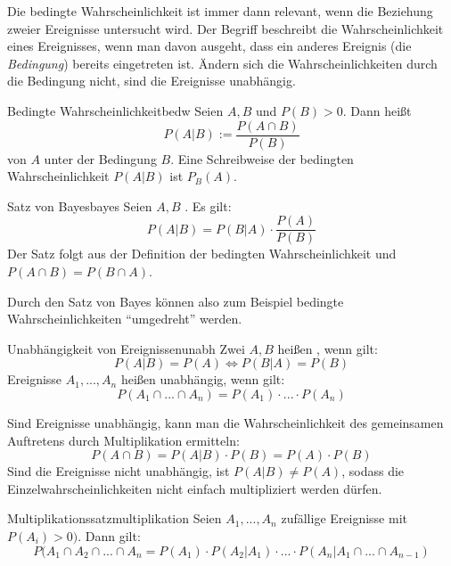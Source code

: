 Die bedingte Wahrscheinlichkeit ist immer dann relevant, wenn die Beziehung
zweier Ereignisse untersucht wird. Der Begriff beschreibt die Wahrscheinlichkeit
eines Ereignisses, wenn man davon ausgeht, dass ein anderes Ereignis (die
\emph{Bedingung}) bereits eingetreten ist. Ändern sich die Wahrscheinlichkeiten
durch die Bedingung nicht, sind die Ereignisse unabhängig.

\begin{definition}{Bedingte Wahrscheinlichkeit}{bedw}
Seien $A, B$  und $P(B)>0$. Dann heißt
\[P(A|B) := \frac{P(A\cap B)}{P(B)}\]
 von $A$ unter der Bedingung $B$.
Eine Schreibweise der bedingten Wahrscheinlichkeit $P(A|B)$ ist $P_B(A)$.
\end{definition}

\begin{theorem}{Satz von Bayes}{bayes}
Seien $A,B$ . Es gilt:
\[P(A|B) = P(B|A) \cdot\frac{P(A)}{P(B)}\]
Der Satz folgt aus der Definition der bedingten Wahrscheinlichkeit und $P(A\cap
B) = P(B\cap A)$.
\end{theorem}
Durch den Satz von Bayes können also zum Beispiel bedingte Wahrscheinlichkeiten
"`umgedreht"' werden.

\begin{definition}{Unabhängigkeit von Ereignissen}{unabh}
Zwei  $A, B$ heißen , wenn gilt:
\[P(A|B) = P(A) \iff P(B|A) = P(B)\]
Ereignisse $A_1,...,A_n$ heißen unabhängig, wenn gilt:
\[P(A_1\cap ...\cap A_n) = P(A_1)\cdot ...\cdot P(A_n)\]
\end{definition}

Sind Ereignisse unabhängig, kann man die Wahrscheinlichkeit des gemeinsamen
Auftretens durch Multiplikation ermitteln:
\[P(A\cap B) = P(A|B)\cdot P(B) = P(A)\cdot P(B)\]
Sind die Ereignisse nicht unabhängig, ist $P(A|B) \ne P(A)$, sodass die
Einzelwahrscheinlichkeiten nicht einfach multipliziert werden dürfen.

\begin{theorem}{Multiplikationssatz}{multiplikation}
Seien $A_1, ...,A_n$ zufällige Ereignisse mit $P(A_i) > 0)$. Dann gilt:
\[P(A_1\cap A_2\cap ...\cap A_n = P(A_1)\cdot P(A_2|A_1) \cdot ...\cdot
P(A_n|A_1\cap ...\cap A_{n-1})\]
\end{theorem}
